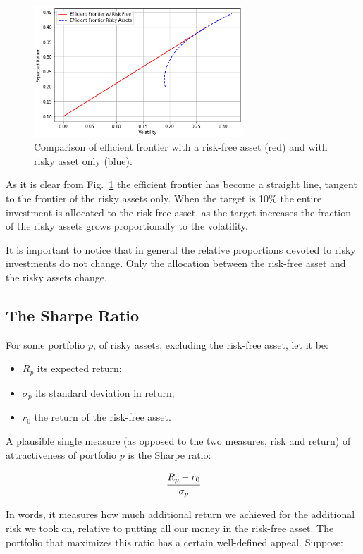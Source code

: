 \begin{figure}[htb]
\centering
    \includegraphics[width=0.7\textwidth]{figures/cal.png}
    \caption{Comparison of efficient frontier with a risk-free asset (red) and with risky asset only (blue).}
    \label{fig:cal}
\end{figure}
    
As it is clear from Fig.~\ref{fig:cal} the efficient frontier has become a
straight line, tangent to the frontier of the risky assets only. When
the target is 10\% the entire investment is allocated to the risk-free
asset, as the target increases the fraction of the risky assets grows
proportionally to the volatility. 

It is important to notice that in general the relative proportions
devoted to risky investments do not change. Only the allocation between
the risk-free asset and the risky assets change.

\subsection{The Sharpe Ratio}\label{the-sharpe-ratio}

For some portfolio \(p\), of risky assets, excluding the risk-free
asset, let it be:

\begin{itemize}
\tightlist
\item
  \(R_p\) its expected return;
\item
  \(\sigma_p\) its standard deviation in return;
\item
  \(r_0\) the return of the risk-free asset.
\end{itemize}

A plausible single measure (as opposed to the two measures, risk and
return) of attractiveness of portfolio \(p\) is the Sharpe ratio:

\[ \cfrac{R_p - r_0}{\sigma_p} \]

In words, it measures how much additional return we achieved for the
additional risk we took on, relative to putting all our money in the
risk-free asset. The portfolio that maximizes this ratio has a certain
well-defined appeal. Suppose:


